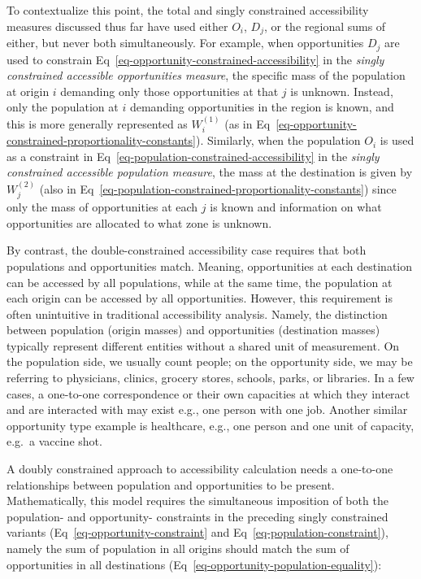 \documentclass[
  10pt,
  letterpaper,
]{article}
\begin{document}
To contextualize this point, the total and singly constrained
accessibility measures discussed thus far have used either \(O_i\),
\(D_j\), or the regional sums of either, but never both simultaneously.
For example, when opportunities \(D_j\) are used to constrain
Eq~\ref{eq-opportunity-constrained-accessibility} in the \emph{singly
constrained accessible opportunities measure}, the specific mass of the
population at origin \(i\) demanding only those opportunities at that
\(j\) is unknown. Instead, only the population at \(i\) demanding
opportunities in the region is known, and this is more generally
represented as \(W_i^{(1)}\) (as in
Eq~\ref{eq-opportunity-constrained-proportionality-constants}).
Similarly, when the population \(O_i\) is used as a constraint in
Eq~\ref{eq-population-constrained-accessibility} in the \emph{singly
constrained accessible population measure}, the mass at the destination
is given by \(W_j^{(2)}\) (also in
Eq~\ref{eq-population-constrained-proportionality-constants}) since only
the mass of opportunities at each \(j\) is known and information on what
opportunities are allocated to what zone is unknown.

By contrast, the double-constrained accessibility case requires that
both populations and opportunities match. Meaning, opportunities at each
destination can be accessed by all populations, while at the same time,
the population at each origin can be accessed by all opportunities.
However, this requirement is often unintuitive in traditional
accessibility analysis. Namely, the distinction between population
(origin masses) and opportunities (destination masses) typically
represent different entities without a shared unit of measurement. On
the population side, we usually count people; on the opportunity side,
we may be referring to physicians, clinics, grocery stores, schools,
parks, or libraries. In a few cases, a one-to-one correspondence or
their own capacities at which they interact and are interacted with may
exist e.g., one person with one job. Another similar opportunity type
example is healthcare, e.g., one person and one unit of capacity, e.g.~a
vaccine shot.

A doubly constrained approach to accessibility calculation needs a
one-to-one relationships between population and opportunities to be
present. Mathematically, this model requires the simultaneous imposition
of both the population- and opportunity- constraints in the preceding
singly constrained variants (Eq~\ref{eq-opportunity-constraint} and
Eq~\ref{eq-population-constraint}), namely the sum of population in all
origins should match the sum of opportunities in all destinations
(Eq~\ref{eq-opportunity-population-equality}):
\end{document}
